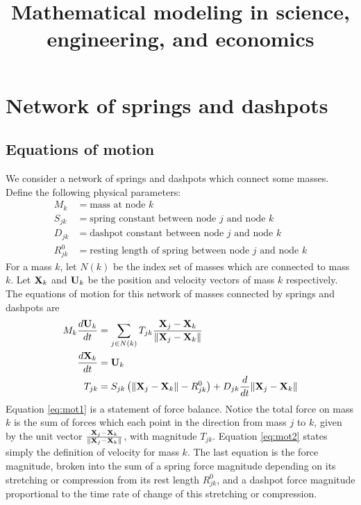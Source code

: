 \documentclass[10pt]{article}
\begin{document}
\title{Mathematical modeling in science, engineering, and economics}
\maketitle

\tableofcontents

\newpage
\section{Network of springs and dashpots}

\subsection{Equations of motion}
We consider a network of springs and dashpots which connect some masses.  Define the following physical parameters:
\begin{align*}
M_k &= \text{mass at node }k \\
S_{jk} &= \text{spring constant between node $j$ and node $k$} \\
D_{jk} &= \text{dashpot constant between node $j$ and node $k$} \\
R^0_{jk} &= \text{resting length of spring between node $j$ and node $k$} 
\end{align*}
For a mass $k$, let $N(k)$ be the index set of masses which are connected to mass $k$.  Let ${\bf X}_k$ and ${\bf U}_k$ be the position and velocity vectors of mass $k$ respectively.  The equations of motion for this network of masses connected by springs and dashpots are
\begin{align}
\label{eq:mot1}
M_k \frac{d {\bf U}_k}{dt} &= \sum_{j \in N(k)} T_{jk} \frac{{\bf X}_j - {\bf X}_k}{\| {\bf X}_j - {\bf X}_k \|} \\
\label{eq:mot2}
\frac{d {\bf X}_k}{dt} &= {\bf U}_k \\
\label{eq:mot3}
T_{jk} &= S_{jk} \left( \|{\bf X}_j - {\bf X}_k\| - R^0_{jk} \right) + D_{jk} \frac{d}{dt} \|{\bf X}_j - {\bf X}_k \|
\end{align}
Equation \eqref{eq:mot1} is a statement of force balance.  Notice the total force on mass $k$ is the sum of forces which each point in the direction from mass $j$ to $k$, given by the unit vector $\frac{{\bf X}_j - {\bf X}_k}{\| {\bf X}_j - {\bf X}_k \|}$, with magnitude $T_{jk}$.  Equation \eqref{eq:mot2} states simply the definition of velocity for mass $k$.  The last equation is the force magnitude, broken into the sum of a spring force magnitude depending on its stretching or compression from its rest length $R_{jk}^0$, and a dashpot force magnitude proportional to the time rate of change of this stretching or compression.
\end{document}
